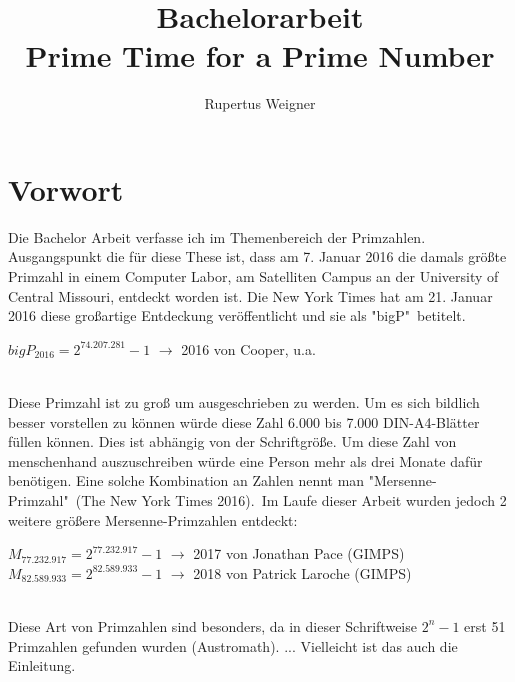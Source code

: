 \documentclass[german,12pt,a4paper]{article}
\title{Bachelorarbeit\\Prime Time for a Prime Number}
\author{Rupertus Weigner}
\begin{document}
\maketitle
\thispagestyle{empty}
\newpage

\section*{Vorwort}
Die Bachelor Arbeit verfasse ich im Themenbereich der Primzahlen. Ausgangspunkt die für diese These ist, dass am 7. Januar 2016 die damals größte Primzahl in einem Computer Labor, am Satelliten Campus an der University of Central Missouri, entdeckt worden ist. Die New York Times hat am 21. Januar 2016 diese großartige Entdeckung veröffentlicht und sie als "bigP"\ betitelt.\\
\begin{center}
$bigP_{2016} = 2^{74.207.281}-1$ $\rightarrow$ 2016 von Cooper, u.a.
\end{center}\
\\Diese Primzahl ist zu groß um ausgeschrieben zu werden. Um es sich bildlich besser vorstellen zu können würde diese Zahl 6.000 bis 7.000 DIN-A4-Blätter füllen können. Dies ist abhängig von der Schriftgröße. Um diese Zahl von menschenhand auszuschreiben würde eine Person mehr als drei Monate dafür benötigen. Eine solche Kombination an Zahlen nennt man "Mersenne-Primzahl"\ (The New York Times 2016).\
Im Laufe dieser Arbeit wurden jedoch 2 weitere größere Mersenne-Primzahlen entdeckt:\\
\begin{center}
$M_{77.232.917} = 2^{77.232.917}-1$ $\rightarrow$ 2017 von Jonathan Pace (GIMPS)\\
$M_{82.589.933} = 2^{82.589.933}-1$ $\rightarrow$ 2018 von Patrick Laroche (GIMPS)
\end{center}\
\\Diese Art von Primzahlen sind besonders, da in dieser Schriftweise $2^n-1$ erst 51 Primzahlen gefunden wurden (Austromath). ... Vielleicht ist das auch die Einleitung.
\newpage

\tableofcontents
\thispagestyle{empty}
\newpage
\end{document}
